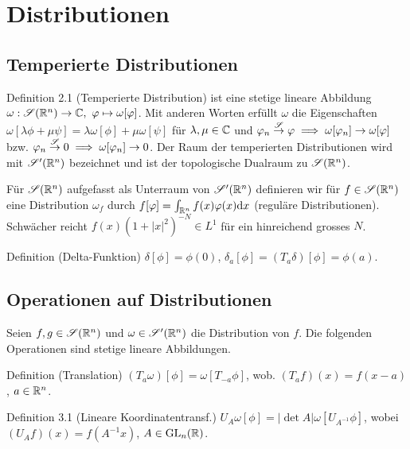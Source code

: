 \chapter{Distributionen}

\section{Temperierte Distributionen}

\begin{namedtheorem}{Definition 2.1 (Temperierte Distribution)}
  ist eine stetige lineare Abbildung $\omega: \mathscr{S}(\mathbb{R}^n)\rightarrow\mathbb{C},\ \varphi\mapsto\omega[\varphi]$. Mit anderen Worten erfüllt $\omega$ die Eigenschaften $\omega[\lambda\phi + \mu\psi] = \lambda\omega[\phi]+\mu\omega[\psi]$ für $\lambda,\mu\in\mathbb{C}$ und $\varphi_n\overset{\mathscr{S}}{\rightarrow}\varphi \implies \omega[\varphi_n]\rightarrow\omega[\varphi]$ bzw. $\varphi_n\overset{\mathscr{S}}{\rightarrow}0 \implies \omega[\varphi_n]\rightarrow0$. Der Raum der temperierten Distributionen wird mit $\mathscr{S}'(\mathbb{R}^n)$ bezeichnet und ist der topologische Dualraum zu $\mathscr{S}(\mathbb{R}^n)$.
\end{namedtheorem}

Für $\mathscr{S}(\mathbb{R}^n)$ aufgefasst als Unterraum von $\mathscr{S}'(\mathbb{R}^n)$ definieren wir für $f\in\mathscr{S}(\mathbb{R}^n)$ eine Distribution $\omega_f$ durch $f[\varphi] = \int_{\mathbb{R}^n}f(x)\varphi(x)\mathrm{d} x$ (reguläre Distributionen). Schwächer reicht $f(x)(1+|x|^2)^{-N}\in L^1$ für ein hinreichend grosses $N$.

\begin{namedtheorem}{Definition (Delta-Funktion)}
$\delta[\phi]=\phi(0)$, $\delta_a[\phi]=(T_a\delta)[\phi]=\phi(a)$.
\end{namedtheorem}

\section{Operationen auf Distributionen}
Seien $f,g\in\mathscr{S}(\mathbb{R}^n)$ und $\omega\in\mathscr{S}'(\mathbb{R}^n)$ die Distribution von $f$. Die folgenden Operationen sind stetige lineare Abbildungen.

\begin{namedtheorem}{Definition (Translation)}
  $(T_a\omega)[\phi] = \omega[T_{-a}\phi]$, wob. $(T_af)(x)=f(x-a)$, $a\in\mathbb{R}^n$.
\end{namedtheorem}

\begin{namedtheorem}{Definition 3.1 (Lineare Koordinatentransf.)}
  $U_A\omega[\phi] = |\det A|\omega[U_{A^{-1}}\phi]$, wobei $(U_Af)(x)=f(A^{-1}x)$, $A\in\mathrm{GL}_n(\mathbb{R})$.
\end{namedtheorem}

